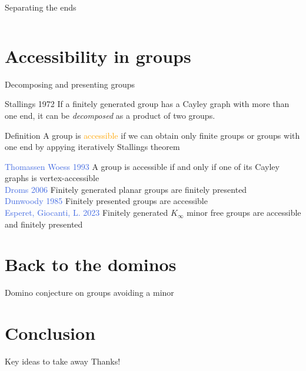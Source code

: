 \documentclass[11pt,dvipsnames,presentation,aspectratio=169]{beamer}
\newcommand{\myorange}{Orange}
\newcommand{\myblue}{RoyalBlue}
\newcommand{\define}[1]{\textcolor{\myorange}{#1}}
\newcommand{\thm}[1]{\textcolor{\myblue}{#1}}
\begin{document}
\begin{frame}{Separating the ends}
\begin{columns}
\begin{column}{.3\linewidth}
\begin{tikzpicture}
      \end{tikzpicture}
      
      \vspace{.5cm}
      \centering
    \end{column}
  \end{columns}
\end{frame}

\section*{Accessibility in groups}
\begin{frame}{Decomposing and presenting groups}
  \begin{block}{Stallings 1972}
    If a finitely generated group has a Cayley graph with more than one end, it
    can be \emph{decomposed} as a product of two groups.
  \end{block}

  \begin{exampleblock}{Definition}
    A group is \define{accessible} if we can obtain only finite groups or groups with one
    end by appying iteratively Stallings theorem
  \end{exampleblock}
  \pause
  \thm{Thomassen Woess 1993} A group is accessible if and only if one of its
  Cayley graphs is vertex-accessible\\
  \pause
  \thm{Droms 2006} Finitely generated planar groups are finitely presented\\ 
  \thm{Dunwoody 1985} Finitely presented groups are accessible\\
  \pause
  \thm{Esperet, Giocanti, L. 2023} Finitely generated $K_\infty$ minor free
  groups are accessible and finitely presented
\end{frame}

\section*{Back to the dominos}
\begin{frame}{Domino conjecture on groups avoiding a minor}
  
\end{frame}

\section*{Conclusion}
\begin{frame}{Key ideas to take away}
  \centering
  Thanks!
\end{frame}
\end{document}
